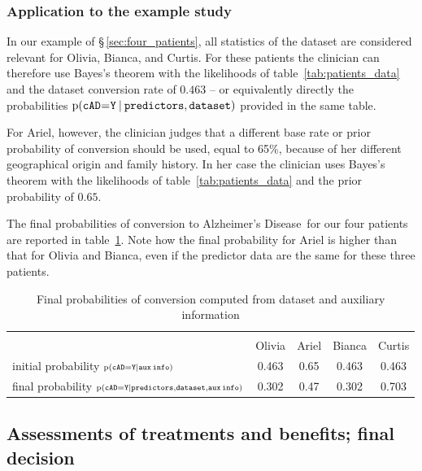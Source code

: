 \documentclass[a4paper,12pt,%
onecolumn,oneside,article,%
british%
]{memoir}
\theoremstyle{remark}
\theoremstyle{innote}
\newcommand*{\p}{\mathrm{p}}%
\renewcommand*{\|}[1][]{\nonscript\:#1\vert\nonscript\:\mathopen{}}
\newcommand*{\mo}[1][=]{\mathclose{}\mathord{\nonscript\mkern0.5mu#1\nonscript\mkern0.5mu}\mathopen{}}
\newcommand*{\sect}{\S}%
\newcommand*{\cad}{\texttt{cAD}}
\newcommand*{\yes}{\texttt{Y}}
\newcommand*{\predictors}{\texttt{predictors}}
\newcommand*{\dataset}{\texttt{dataset}}
\newcommand*{\auxinfo}{\texttt{aux\,info}}
\newcommand*{\ad}{Alzheimer's Disease}
\begin{document}
\subsubsection{Application to the example study}
\label{sec:posterior_application}

In our example of \sect\,\ref{sec:four_patients}, all statistics of the dataset are considered relevant for Olivia, Bianca, and Curtis. For these patients the clinician can therefore use Bayes's theorem with the likelihoods of table~\ref{tab:patients_data} and the dataset conversion rate of $0.463$ -- or equivalently directly the probabilities $\p(\cad\mo\yes \| \predictors, \dataset)$ provided in the same table.

For Ariel, however, the clinician judges that a different base rate or prior probability of conversion should be used, equal to 65\%, because of her different geographical origin and family history. In her case the clinician uses Bayes's theorem with the likelihoods of table~\ref{tab:patients_data} and the prior probability of $0.65$.

The final probabilities of conversion to \ad\ for our four patients are reported in table~\ref{tab:posterior_patients}. Note how the final probability for Ariel is higher than that for Olivia and Bianca, even if the predictor data are the same for these three patients.

\medskip
\begin{table}[b]
  \centering
  \begin{tabularx}{\linewidth}{Xcccc}
    \hline\\[-1.5\jot]
    &{\small Olivia} &{\small Ariel} &{\small Bianca} &{\small Curtis}
    \\[\jot]
    \parbox{7em}{\small initial probability\\$\scriptstyle\p(\cad\mo\yes \| \auxinfo)$}&
    0.463&0.65&0.463&0.463
    \\[3\jot]
    \parbox{7em}{\small final probability\\$\scriptstyle\p(\cad\mo\yes \| \predictors, \dataset, \auxinfo)$}&
    0.302&0.47&0.302&0.703
    \\[\jot]
    \hline
  \end{tabularx}
    \caption{Final probabilities of conversion computed from dataset and auxiliary information}\label{tab:posterior_patients}
\end{table}


\bigskip%
\subsection{Assessments of treatments and benefits; final decision}
\label{sec:utilities_step}
\end{document}
